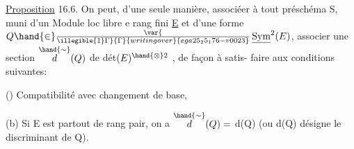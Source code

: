 \uline{Proposition} 16.6. On peut,  d'une seule manière, associéer à tout
préschéma S, muni d'un Module loc libre e rang fini \uline{E} et d'une forme 
$Q \hand{\in}\var{\over{\illegible{1}}{\Gamma}}{\Gamma}{writing over}{ega25_25_176-v0023}\,\underline{\mathrm{Sym}}^2(E)$, associer une section $\overset{\hand{\sim}}{d}(Q)$ de dét$(E)^{\hand{\otimes}2}$ , de façon à satis-%
faire aux conditions suivantes:

() Compatibilité avec changement de base,

(b) Si E est partout de rang pair, on a $\overset{\hand{\sim}}{d}(Q) =$ d(Q) (ou d(Q)
désigne le discriminant de Q).

